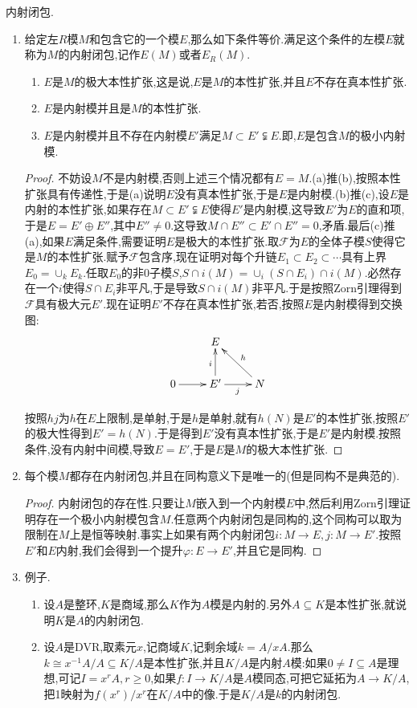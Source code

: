 内射闭包.
\begin{enumerate}
	\item 给定左$R$模$M$和包含它的一个模$E$,那么如下条件等价.满足这个条件的左模$E$就称为$M$的内射闭包,记作$E(M)$或者$E_R(M)$.
	\begin{enumerate}
		\item $E$是$M$的极大本性扩张,这是说,$E$是$M$的本性扩张,并且$E$不存在真本性扩张.
		\item $E$是内射模并且是$M$的本性扩张.
		\item $E$是内射模并且不存在内射模$E'$满足$M\subset E'\subsetneqq E$.即,$E$是包含$M$的极小内射模.
	\end{enumerate}
	\begin{proof}
		
		不妨设$M$不是内射模,否则上述三个情况都有$E=M$.(a)推(b),按照本性扩张具有传递性,于是(a)说明$E$没有真本性扩张,于是$E$是内射模.(b)推(c),设$E$是内射的本性扩张,如果存在$M\subset E'\subsetneqq E$使得$E'$是内射模,这导致$E'$为$E$的直和项,于是$E=E'\oplus E''$,其中$E''\not=0$.这导致$M\cap E''\subset E'\cap E''=0$,矛盾.最后(c)推(a),如果$E$满足条件,需要证明$E$是极大的本性扩张.取$\mathscr{F}$为$E$的全体子模$S$使得它是$M$的本性扩张.赋予$\mathscr{F}$包含序,现在证明对每个升链$E_1\subset E_2\subset\cdots$具有上界$E_0=\cup_kE_k$.任取$E_0$的非0子模$S$,$S\cap i(M)=\cup_i(S\cap E_i)\cap i(M)$.必然存在一个$i$使得$S\cap E_i$非平凡,于是导致$S\cap i(M)$非平凡.于是按照Zorn引理得到$\mathscr{F}$具有极大元$E'$.现在证明$E'$不存在真本性扩张,若否,按照$E$是内射模得到交换图:
		$$\xymatrix{
			&E&\\
			0\ar[r]&E'\ar[u]^i\ar[r]_j&N\ar[ul]_h
		}$$
		
		按照$hj$为$h$在$E$上限制,是单射,于是$h$是单射,就有$h(N)$是$E'$的本性扩张,按照$E'$的极大性得到$E'=h(N)$.于是得到$E'$没有真本性扩张,于是$E'$是内射模.按照条件,没有内射中间模,导致$E=E'$,于是$E$是$M$的极大本性扩张.
	\end{proof}
    \item 每个模$M$都存在内射闭包,并且在同构意义下是唯一的(但是同构不是典范的).
    \begin{proof}
    	
    	内射闭包的存在性.只要让$M$嵌入到一个内射模$E$中,然后利用Zorn引理证明存在一个极小内射模包含$M$.任意两个内射闭包是同构的,这个同构可以取为限制在$M$上是恒等映射.事实上如果有两个内射闭包$i:M\to E,j:M\to E'$.按照$E'$和$E$内射,我们会得到一个提升$\varphi:E\to E'$,并且它是同构.
    \end{proof}
    \item 例子.
    \begin{enumerate}
    	\item 设$A$是整环,$K$是商域,那么$K$作为$A$模是内射的.另外$A\subseteq K$是本性扩张,就说明$K$是$A$的内射闭包.
    	\item 设$A$是DVR,取素元$x$,记商域$K$,记剩余域$k=A/xA$.那么$k\cong x^{-1}A/A\subseteq K/A$是本性扩张,并且$K/A$是内射$A$模:如果$0\not=I\subseteq A$是理想,可记$I=x^rA,r\ge0$,如果$f:I\to K/A$是$A$模同态,可把它延拓为$A\to K/A$,把1映射为$f(x^r)/x^r$在$K/A$中的像.于是$K/A$是$k$的内射闭包.
    \end{enumerate}
\end{enumerate}

